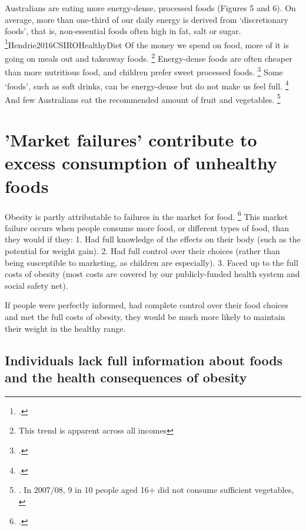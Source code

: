 \documentclass[embargoed]{grattan}
\begin{document}
Australians are eating more energy-dense, processed foods (Figures 5 and 6).
On average, more than one-third of our daily energy is derived from `discretionary foods', that is, non-essential foods often high in fat, salt or sugar. \footcite{ABS20144364055007AustralianHealth}{Hendrie2016CSIROHealthyDiet} Of the money we spend on food, more of it is going on meals out and takeaway foods.%
\footnote{This trend is apparent across all incomes} Energy-dense foods are often cheaper than more nutritious food, and children prefer sweet processed foods.%
\footcite{Roberto2015Patchyprogressobesity} Some `foods', such as soft drinks, can be energy-dense but do not make us feel full.%
\footcites{Mozaffarian2016politicssciencesoda}{Fletcher2011Aresoftdrink}{Malik2006Intakesugarsweetened}{Ruyter2012trialsugarfree}{Johnson2009Dietarysugarsintake} And few Australians eat the recommended amount of fruit and vegetables.%
\footnote{\textcite{Hendrie2016CSIROHealthyDiet}.
In 2007/08, 9 in 10 people aged 16+ did not consume sufficient vegetables, \textcite{Health2012Australiasfood}}

\section{'Market failures’ contribute to excess consumption of unhealthy foods }\label{many-of-the-factors-contributing-to-excess-energy-in-are-market-failures}

Obesity is partly attributable to failures in the market for food.%
\footcite{Karnani2016ObesityCrisisas} This market failure occurs when people consume more food, or different types of food, than they would if they: 1.
Had full knowledge of the effects on their body (such as the potential for weight gain). 2.
Had full control over their choices (rather than being susceptible to marketing, as children are especially). 3.
Faced up to the full costs of obesity (most costs are covered by our publicly-funded health system and social safety net).

If people were perfectly informed, had complete control over their food choices and met the full costs of obesity, they would be much more likely to maintain their weight in the healthy range.

\subsection{Individuals lack full information about foods and the health consequences of obesity }\label{individuals-lack-full-information-about-foods-and-the-health-consequences-of-obesity}
\end{document}
